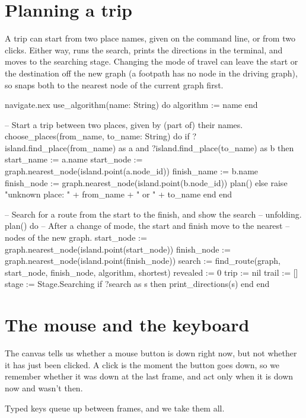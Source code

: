 \section{Planning a trip}

A trip can start from two place names, given on the command line, or from
two clicks. Either way,  runs the search, prints the directions
in the terminal, and moves to the searching stage. Changing the mode of
travel can leave the start or the destination off the new graph (a
footpath has no node in the driving graph), so  snaps both to
the nearest node of the current graph first.

\begin{continued}{navigate.nex}
  use_algorithm(name: String) do
    algorithm := name
  end

  -- Start a trip between two places, given by (part of) their names.
  choose_places(from_name, to_name: String) do
    if ?island.find_place(from_name) as a and ?island.find_place(to_name) as b then
      start_name := a.name
      start_node := graph.nearest_node(island.point(a.node_id))
      finish_name := b.name
      finish_node := graph.nearest_node(island.point(b.node_id))
      plan()
    else
      raise "unknown place: " + from_name + " or " + to_name
    end
  end

  -- Search for a route from the start to the finish, and show the search
  -- unfolding.
  plan() do
    -- After a change of mode, the start and finish move to the nearest
    -- nodes of the new graph.
    start_node := graph.nearest_node(island.point(start_node))
    finish_node := graph.nearest_node(island.point(finish_node))
    search := find_route(graph, start_node, finish_node, algorithm, shortest)
    revealed := 0
    trip := nil
    trail := []
    stage := Stage.Searching
    if ?search as s then
      print_directions(s)
    end
  end
\end{continued}

\section{The mouse and the keyboard}

The canvas tells us whether a mouse button is down right now, but not
whether it has just been clicked. A click is the moment the button goes
down, so we remember whether it was down at the last frame, and act only
when it is down now and wasn't then.

Typed keys queue up between frames, and we take them all.

